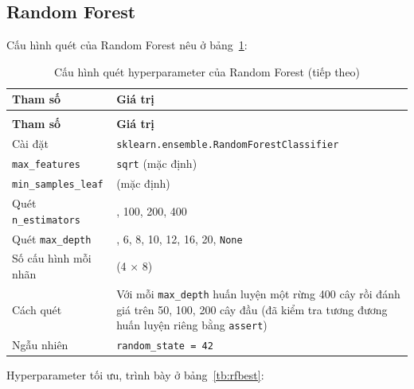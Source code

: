 \documentclass[a4paper]{report}
\begin{document}
\subsection{Random Forest}

Cấu hình quét của Random Forest nêu ở bảng~\ref{tb:rfcfg}:

{\small{}\renewcommand{}\setlength\tabcolsep{3pt}
\begin{longtable}{|>{\raggedright\arraybackslash}p{104.47pt}|>{\raggedright\arraybackslash}p{336.57pt}|}
\caption{Cấu hình quét hyperparameter của Random Forest}\label{tb:rfcfg}\\
\hline
\textbf{Tham số} & \textbf{Giá trị} \\ \hline\endfirsthead
\caption[]{Cấu hình quét hyperparameter của Random Forest (tiếp theo)}\\
\hline
\textbf{Tham số} & \textbf{Giá trị} \\ \hline\endhead
Cài đặt & \texttt{sklearn.ensemble.RandomForestClassifier} \\ \hline
\texttt{max\_\allowbreak{}features} & \texttt{sqrt} (mặc định) \\ \hline
\texttt{min\_\allowbreak{}samples\_\allowbreak{}leaf} & 1 (mặc định) \\ \hline
Quét \texttt{n\_\allowbreak{}estimators} & 50, 100, 200, 400 \\ \hline
Quét \texttt{max\_\allowbreak{}depth} & 4, 6, 8, 10, 12, 16, 20, \texttt{None} \\ \hline
Số cấu hình mỗi nhãn & 32 (4 × 8) \\ \hline
Cách quét & Với mỗi \texttt{max\_\allowbreak{}depth} huấn luyện một rừng 400 cây rồi đánh giá trên 50, 100, 200 cây đầu (đã kiểm tra tương đương huấn luyện riêng bằng \texttt{assert}) \\ \hline
Ngẫu nhiên & \texttt{random\_\allowbreak{}state = 42} \\ \hline
\end{longtable}
}

Hyperparameter tối ưu, trình bày ở bảng~\ref{tb:rfbest}:
\end{document}
